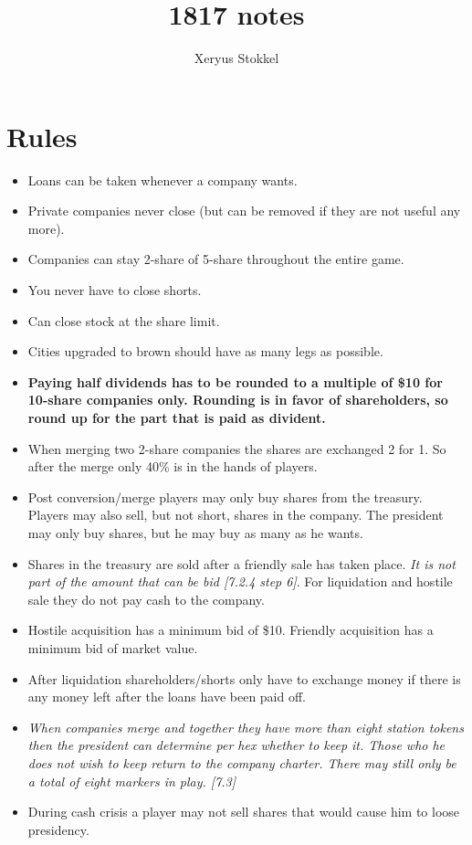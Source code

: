 \documentclass[a4paper,twocolumn]{article}
\title{1817 notes}
\author{Xeryus Stokkel}
\begin{document}
\maketitle

\section{Rules}
\begin{itemize}
	\item Loans can be taken whenever a company wants.
	\item Private companies never close (but can be removed if they are not useful any more).
	\item Companies can stay 2-share of 5-share throughout the entire game.
	\item You never have to close shorts.
	\item Can close stock at the share limit.
	\item Cities upgraded to brown should have as many legs as possible.
	\item \textbf{Paying half dividends has to be rounded to a multiple of \$10
		for 10-share companies only. Rounding is in favor of shareholders, so
		round up for the part that is paid as divident.}
	\item When merging two 2-share companies the shares are exchanged 2 for 1.
	So after the merge only 40\% is in the hands of players.
	\item Post conversion/merge players may only buy shares from the treasury.
	Players may also sell, but not short, shares in the company. The president
	may only buy shares, but he may buy as many as he wants.
	\item Shares in the treasury are sold after a friendly sale has taken
	place. \emph{It is not part of the amount that can be bid [7.2.4 step 6]}.
	For liquidation and hostile sale they do not pay cash to the company.
	\item Hostile acquisition has a minimum bid of \$10. Friendly acquisition
	has a minimum bid of market value.
	\item After liquidation shareholders/shorts only have to exchange money if
	there is any money left after the loans have been paid off.
	\item \emph{When companies merge and together they have more than eight
		station tokens then the president can determine per hex whether to keep
		it. Those who he does not wish to keep return to the company charter.
		There may still only be a total of eight markers in play. [7.3]}
	\item During cash crisis a player may not sell shares that would cause him
	to loose presidency.
\end{itemize}
\end{document}

